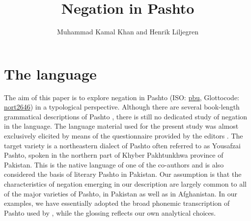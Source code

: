 \documentclass[output=paper,colorlinks,citecolor=brown]{langscibook}
\author{Muhammad Kamal Khan\affiliation{Allama Iqbal Open University} and Henrik Liljegren\affiliation{Stockholm University}}
\title{Negation in Pashto}
\begin{document}
\maketitle 

\section{The language}\label{sec:pas:1}

The aim of this paper is to explore negation in Pashto  (ISO: \href{https://iso639-3.sil.org/code/pbu}{pbu}, Glottocode: \href{https://glottolog.org/resource/languoid/id/nort2646}{nort2646}) in a typological perspective. Although there are several book-length grammatical descriptions of Pashto \citep{Babrakzai1999,David2014,Grjunberg1987,Lorenz1979,Penzl1955,TegeyRobson1996}, there is still no dedicated study of negation in the language. The language material used for the present study was almost exclusively elicited by means of the questionnaire provided by the editors . The target variety is a northeastern dialect of Pashto often referred to as Yousafzai Pashto, spoken in the northern part of Khyber Pakhtunkhwa province of Pakistan. This is the native language of one of the co-authors and is also considered the basis of literary Pashto in Pakistan. Our assumption is that the characteristics of negation emerging in our description are largely common to all of the major varieties of Pashto, in Pakistan as well as in Afghanistan. In our examples, we have essentially adopted the broad phonemic transcription of Pashto used by \citet{David2014}, while the glossing reflects our own analytical choices.
\end{document}
